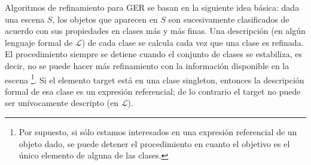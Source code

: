 
Algoritmos de refinamiento para GER se basan en la siguiente idea b\'asica:
dada una escena $S$, los objetos que aparecen en $S$ son sucesivamente
clasificados de acuerdo con sus propiedades en clases m\'as y m\'as finas. 
Una descripci\'on (en alg\'un lenguaje formal de $\mathcal{L}$) de cada
clase se calcula cada vez que una clase es refinada. El procedimiento siempre
se detiene cuando el conjunto de clases se estabiliza, es decir, no se puede hacer m\'as refinamiento
con la informaci\'on disponible en la escena \footnote{Por supuesto, si s\'olo estamos interesados en una expresi\'on referencial de un objeto dado, se puede detener el procedimiento en cuanto el objetivo es el
   \'unico elemento de alguna de las clases.}. Si el elemento target est\'a en
una clase singleton, entonces la descripci\'on formal de esa clase es un
expresi\'on referencial; de lo contrario el target no puede ser un\'{i}vocamente
descripto (en $\mathcal{L}$).\\



